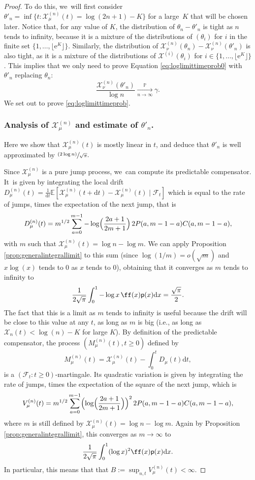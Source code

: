 \documentclass[JEP,XML,SOM,Unicode,NoFloatCountersInSection, NoEqCountersInSection,published]{cedram}
\newcommand{\psfrac}[2]{\sfrac{(#1)}{#2}}
\newcommand{\Xmun}{\mathcal{X}^{(n)}_{\mu}}
\newcommand{\Xnun}{\mathcal{X}^{(n)}_{\nu}}
\let\dH\gamma
\newcommand{\pp}{\mathsf{p}}
\newcommand{\pr}{\mathbb{P}}
\newcommand{\dd}{\mathrm{d}}
\theoremstyle{definition}
\begin{document}
\begin{proof}
To do this, we~will first consider $\theta'_n=\inf\{t: \Xmun(t) = \log (2n+1)-K\}$ for a large~$K$ that will be chosen later. Notice that, for any value of $K$, the distribution of $\theta_n-\theta'_n$ is tight as $n$ tends to infinity, because it is a mixture of the distributions of $(\theta_i)$ for $i$ in the finite set $\{1,\ldots,\lfloor \mathrm{e}^{K}\rfloor\}$. Similarly, the distribution of $\Xnun(\theta_n)-\Xnun(\theta'_n)$ is also tight, as it is a mixture of the distributions of $\mathcal{X}^{(i)}(\theta_i)$ for $i\in \{1,\ldots,\lfloor \mathrm{e}^{K}\rfloor\}$. This implies that we only need to prove Equation \eqref{eq:loglimittimeprob0} with $\theta'_n$ replacing $\theta_n$:\vspace*{-3pt}
\begin{equation}\label{eq:loglimittimeprob}
\frac{ \Xnun(\theta'_n)}{\log n} \xrightarrow[\textstyle n\to\infty]{\textstyle\pr} \dH.
\end{equation}
We set out to prove \eqref{eq:loglimittimeprob}.

\subsubsection*{Analysis of $\Xmun$ and estimate of $\theta'_n$.} Here we show that $\Xmun(t)$ is mostly linear in $t$, and deduce that $\theta'_n$ is well approximated by $\psfrac{2\log n}{\sqrt{\pi}}.
$

Since $\mathcal{X}^{(n)}_{\mu}$ is a pure jump process, we~can compute its predictable compensator. It~is given by integrating the local drift $D_\mu^{(n)}(t)=\frac{1}{ \mathrm{d}t} \mathbb{E}[\mathcal{X}^{(n)}_{\mu}(t+\dd t)-\mathcal{X}^{(n)}_{\mu}(t)\mid \mathcal{F}_t]$ which is equal to the rate of jumps, times the expectation of the next jump, that is
\[
D_{\mu}^{(n)}(t)=m^{1/2}\sum_{a=0}^{m-1} -\log\Bigl(\frac{2a+1}{2m+1}\Bigr)\, 2P(a,m-1-a)C(a,m-1-a),
\]
with $m$ such that $\mathcal{X}^{(n)}_{\mu}(t)=\log n - \log m$.
We can apply Proposition \ref{prop:generalintegrallimit} to this sum (since $\log (1/m)=o(\sqrt{m})$ and $x\log(x)$ tends to $0$ as $x$ tends to $0$), obtaining that it converges as $m$ tends to infinity to
\[
\frac1{2\sqrt{\pi}}\int_0^1 -\log x \, \ff(x) \pp(x)\dd x=\frac{\sqrt{\pi}}{2}.
\]
The fact that this is a limit as $m$ tends to infinity is useful because the drift will be close to this value at any $t$, as long as $m$ is big (i.e., as long as $\mathcal{X}_n(t)< \log(n)-K$ for large $K$). By definition of the predictable compensator, the process $(M^{(n)}_{\mu}(t),t\geq 0)$ defined by
\[
M^{(n)}_{\mu}(t)=\Xmun(t)-\int_0^t D_{\mu}(t)\mathrm dt,
\]
is a $(\mathcal{F}_t : t \geq 0)$-martingale. Its quadratic variation is given by integrating the rate of jumps, times the expectation of the square of the next jump, which is
\[
V_{\mu}^{(n)}(t)=m^{1/2}\sum_{a=0}^{m-1} \Bigl(\log\Bigl(\frac{2a+1}{2m+1}\Bigr)\Bigr)^2\, 2P(a,m-1-a)C(a,m-1-a),
\]
where $m$ is still defined by $\mathcal{X}^{(n)}_{\mu}(t)=\log n - \log m$. Again by Proposition \ref{prop:generalintegrallimit}, this converges as $m \to \infty$ to
\[
\frac1{2\sqrt{\pi}}\int_0^1 (\log x)^2\ff(x)\pp(x)\dd x.
\]
In particular, this means that that $B:=\sup_{n,t} V^{(n)}_{\mu}(t)<\infty$.


\end{proof}
\end{document}
